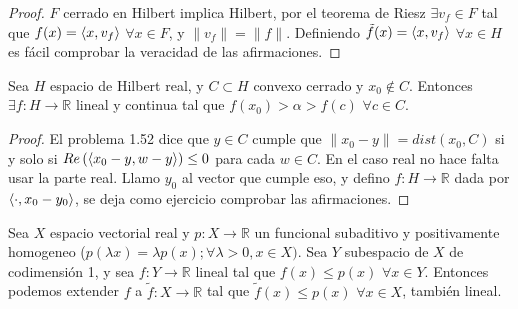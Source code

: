 \begin{proof}
  $F$ cerrado en Hilbert implica Hilbert, por el teorema de Riesz $\exists v_f
  \in F$ tal que $f(x)=\left\langle x,v_f\right\rangle$ $\forall x\in F$, y $\|v_f\|=\|f\|$.
  Definiendo $\tilde f(x)=\left\langle x,v_f\right\rangle$ $\forall x \in H$ es fácil comprobar la
  veracidad de las afirmaciones.
\end{proof}

\begin{theorem}
  Sea $H$ espacio de Hilbert real, y $C\subset H$ convexo cerrado y $x_0 \not\in C$.
  Entonces $\exists f:H\to \mathbb{R}$ lineal y continua tal que
  $f(x_0)>\alpha>f(c)$ $\forall c \in C$.
\end{theorem}

\begin{proof}
El problema 1.52 dice que $y\in C$ cumple que $\|x_0-y\|=dist(x_0,C)$ si y solo
si $Re\left( \left\langle x_0-y,w-y\right\rangle \right) \le 0$ para cada $w\in C$. En el caso
real no hace falta usar la parte real. Llamo $y_0$ al vector que cumple eso, y
defino $f:H\to \mathbb{R}$ dada por $\left\langle\cdot ,x_0-y_0\right\rangle$, se deja como
ejercicio comprobar las afirmaciones.
\end{proof}

\begin{lemma}
  Sea $X$ espacio vectorial real y $p:X\to \mathbb{R}$ un funcional subaditivo y
  positivamente homogeneo ($p(\lambda x)=\lambda p(x); \forall \lambda>0, x\in
  X)$. Sea $Y$ subespacio de $X$ de codimensión 1, y sea $f:Y\to \mathbb{R}$ 
  lineal tal que $f(x)\le p(x)$ $\forall x\in Y$. Entonces podemos extender $f$ 
  a $\tilde{f}:X\to \mathbb{R}$ tal que $\tilde{f}(x)\le p(x)$ $\forall x\in
  X$, también lineal.
\end{lemma}

